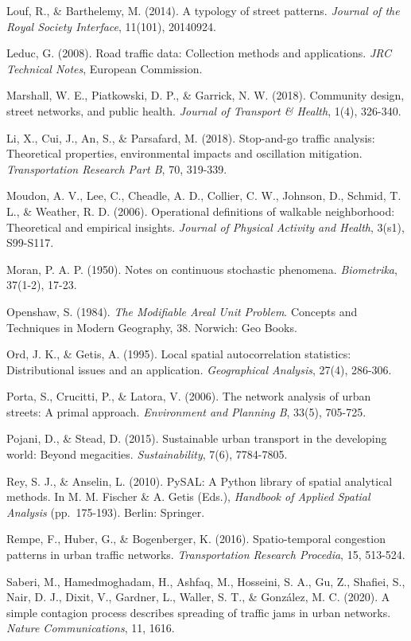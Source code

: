 Louf, R., \& Barthelemy, M. (2014). A typology of street patterns. \emph{Journal of the Royal Society Interface}, 11(101), 20140924.

Leduc, G. (2008). Road traffic data: Collection methods and applications. \emph{JRC Technical Notes}, European Commission.

Marshall, W. E., Piatkowski, D. P., \& Garrick, N. W. (2018). Community design, street networks, and public health. \emph{Journal of Transport \& Health}, 1(4), 326-340.

Li, X., Cui, J., An, S., \& Parsafard, M. (2018). Stop-and-go traffic analysis: Theoretical properties, environmental impacts and oscillation mitigation. \emph{Transportation Research Part B}, 70, 319-339.

Moudon, A. V., Lee, C., Cheadle, A. D., Collier, C. W., Johnson, D., Schmid, T. L., \& Weather, R. D. (2006). Operational definitions of walkable neighborhood: Theoretical and empirical insights. \emph{Journal of Physical Activity and Health}, 3(s1), S99-S117.

Moran, P. A. P. (1950). Notes on continuous stochastic phenomena. \emph{Biometrika}, 37(1-2), 17-23.

Openshaw, S. (1984). \emph{The Modifiable Areal Unit Problem}. Concepts and Techniques in Modern Geography, 38. Norwich: Geo Books.

Ord, J. K., \& Getis, A. (1995). Local spatial autocorrelation statistics: Distributional issues and an application. \emph{Geographical Analysis}, 27(4), 286-306.

Porta, S., Crucitti, P., \& Latora, V. (2006). The network analysis of urban streets: A primal approach. \emph{Environment and Planning B}, 33(5), 705-725.

Pojani, D., \& Stead, D. (2015). Sustainable urban transport in the developing world: Beyond megacities. \emph{Sustainability}, 7(6), 7784-7805.

Rey, S. J., \& Anselin, L. (2010). PySAL: A Python library of spatial analytical methods. In M. M. Fischer \& A. Getis (Eds.), \emph{Handbook of Applied Spatial Analysis} (pp.~175-193). Berlin: Springer.

Rempe, F., Huber, G., \& Bogenberger, K. (2016). Spatio-temporal congestion patterns in urban traffic networks. \emph{Transportation Research Procedia}, 15, 513-524.

Saberi, M., Hamedmoghadam, H., Ashfaq, M., Hosseini, S. A., Gu, Z., Shafiei, S., Nair, D. J., Dixit, V., Gardner, L., Waller, S. T., \& González, M. C. (2020). A simple contagion process describes spreading of traffic jams in urban networks. \emph{Nature Communications}, 11, 1616.

